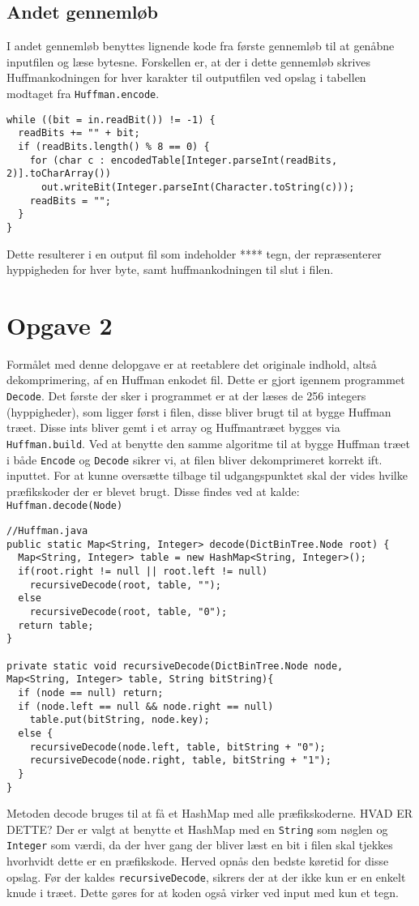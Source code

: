 \documentclass{article}
\begin{document}
\subsection*{Andet gennemløb}
I andet gennemløb benyttes lignende kode fra første gennemløb til at genåbne inputfilen og læse bytesne. Forskellen er, at der i dette gennemløb skrives Huffmankodningen for hver karakter til outputfilen ved opslag i tabellen modtaget fra \texttt{Huffman.encode}.

\begin{lstlisting}
while ((bit = in.readBit()) != -1) {
  readBits += "" + bit;
  if (readBits.length() % 8 == 0) {
    for (char c : encodedTable[Integer.parseInt(readBits, 2)].toCharArray())
      out.writeBit(Integer.parseInt(Character.toString(c)));
    readBits = "";
  }
}
\end{lstlisting}

Dette resulterer i en output fil som indeholder **** tegn, der repræsenterer hyppigheden for hver byte, samt huffmankodningen til slut i filen.

\newpage

\section*{Opgave 2}
Formålet med denne delopgave er at reetablere det originale indhold, altså dekomprimering, af en Huffman enkodet fil. Dette er gjort igennem programmet \texttt{Decode}.
Det første der sker i programmet er at der læses de 256 integers (hyppigheder), som ligger først i filen, disse bliver brugt til at bygge Huffman træet. Disse ints bliver gemt i et array og Huffmantræet bygges via \texttt{Huffman.build}. Ved at benytte den samme algoritme til at bygge Huffman træet i både \texttt{Encode} og \texttt{Decode} sikrer vi, at filen bliver dekomprimeret korrekt ift. inputtet. 
For at kunne oversætte tilbage til udgangspunktet skal der vides hvilke præfikskoder der er blevet brugt. Disse findes ved at kalde: \texttt{Huffman.decode(Node)}
\begin{lstlisting}
//Huffman.java
public static Map<String, Integer> decode(DictBinTree.Node root) {
  Map<String, Integer> table = new HashMap<String, Integer>();
  if(root.right != null || root.left != null)
    recursiveDecode(root, table, "");
  else
    recursiveDecode(root, table, "0");
  return table;
}

private static void recursiveDecode(DictBinTree.Node node, 
Map<String, Integer> table, String bitString){
  if (node == null) return;
  if (node.left == null && node.right == null)
    table.put(bitString, node.key);
  else {
    recursiveDecode(node.left, table, bitString + "0");
    recursiveDecode(node.right, table, bitString + "1");
  }
}
\end{lstlisting}
Metoden decode bruges til at få et HashMap med alle præfikskoderne. HVAD ER DETTE? Der er valgt at benytte et HashMap med en \texttt{String} som nøglen og \texttt{Integer} som værdi, da der hver gang der bliver læst en bit i filen skal tjekkes hvorhvidt dette er en præfikskode. Herved opnås den bedste køretid for disse opslag.
Før der kaldes \texttt{recursiveDecode}, sikrers der at der ikke kun er en enkelt knude i træet. Dette gøres for at koden også virker ved input med kun et tegn.
\end{document}

